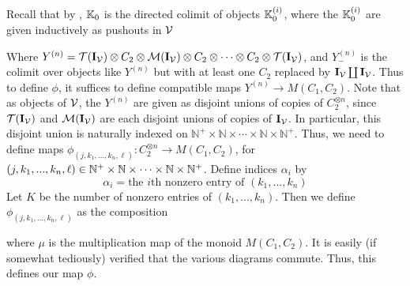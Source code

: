 \documentclass[12pt]{amsart}
\begin{document}
Recall that by \cite{BergerMoerdijk2012}, $\mathbb{K}_0$ is the directed colimit of objects $\mathbb{K}_0^{(i)}$, where the $\mathbb{K}_0^{(i)}$ are given inductively as pushouts in $\mathcal{V}$
\begin{center}
\end{center}
Where $Y^{(n)} = {\mathcal{T}(\mathbf{I}_\mathcal{V})} \otimes C_2 \otimes {\mathcal{M}(\mathbf{I}_\mathcal{V})} \otimes C_2 \otimes \cdots \otimes C_2 \otimes {\mathcal{T}(\mathbf{I}_\mathcal{V})}$, and $Y^{(n)}_-$ is the colimit over objects like $Y^{(n)}$ but with at least one $C_2$ replaced by $\mathbf{I}_\mathcal{V} \coprod \mathbf{I}_\mathcal{V}$.
Thus to define $\phi$, it suffices to define compatible maps $Y^{(n)} \to M(C_1,C_2)$. 
Note that as objects of $\mathcal{V}$, the $Y^{(n)}$ are given as disjoint unions of copies of $C_2^{\otimes n}$, since ${\mathcal{T}(\mathbf{I}_\mathcal{V})}$ and ${\mathcal{M}(\mathbf{I}_\mathcal{V})}$ are each disjoint unions of copies of $\mathbf{I}_\mathcal{V}$.
In particular, this disjoint union is naturally indexed on $\mathbb{N}^{+} \times \mathbb{N} \times \cdots \times \mathbb{N} \times \mathbb{N}^+$. 
Thus, we need to define maps $\phi_{(j,k_1,...,k_n,\ell)}: C_2^{\otimes n} \to M(C_1,C_2)$,
for $(j,k_1,..., k_n, \ell) \in \mathbb{N}^+ \times \mathbb{N} \times \cdots \times \mathbb{N} \times \mathbb{N}^+$.
Define indices $\alpha_i$ by 
$$\alpha_i = \text{the }i\text{th nonzero entry of }(k_1,...,k_n)$$
Let $K$ be the number of nonzero entries of $(k_1,...,k_n)$. 
Then we define $\phi_{(j,k_1,...,k_n, \ell)}$ as the composition  
\begin{center}
\end{center}
where $\mu$ is the multiplication map of the monoid $M(C_1,C_2)$. 
It is easily (if somewhat tediously) verified that the various diagrams commute.
Thus, this defines our map $\phi$.
\end{document}
